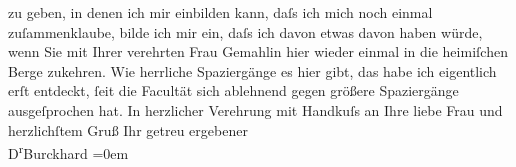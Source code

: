 \begin{ledgroupsized}[t]{13cm}
                    zu geben, in denen ich mir einbilden kann, daſs ich mich noch einmal
                    zuſammenklaube, bilde ich mir ein, daſs ich davon etwas davon haben würde, wenn
                    Sie mit Ihrer verehrten Frau Gemahlin hier wieder einmal in die heimiſchen Berge zukehren. Wie
                    herrliche Spaziergänge es hier gibt, das habe ich eigentlich erſt entdeckt, ſeit
                    die Facultät sich ablehnend gegen größere Spaziergänge ausgeſprochen hat.\pend
           \pstart
           {\pb}In herzlicher Verehrung mit Handkuſs
                    an Ihre liebe Frau und
                    herzlichſtem Gruß\pend
           \pstart
           Ihr getreu ergebener{\\[\baselineskip]}\spacefill\mbox{D\textsuperscript{r}Burckhard}\pend
           \leftskip=0em{}\endnumbering{}\end{ledgroupsized}  \newcommand{\dateiname}{L01783}\newcommand{\titel}{Max Burckhard an Arthur Schnitzler, 14. 7. 1908}\newcommand{\editorInnen}{Martin Anton Müller und Gerd-Hermann Susen}
      